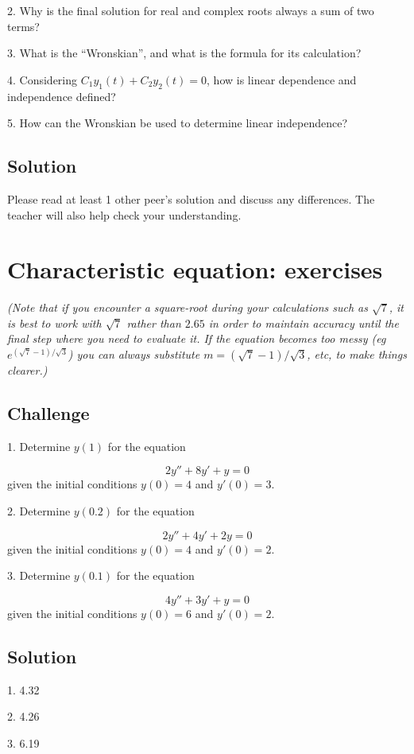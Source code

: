 2. Why is the final solution for real and complex roots always a sum of two terms?

3. What is the ``Wronskian'', and what is the formula for its calculation?

4. Considering $C_1 y_1(t) + C_2 y_2(t) = 0$, how is linear dependence and independence defined?

5. How can the Wronskian be used to determine linear independence?

\subsection*{Solution}
Please read at least 1 other peer's solution and discuss any differences. The teacher will also help check your understanding.

\timebox




\newpage
\section{Characteristic equation: exercises}

\emph{(Note that if you encounter a square-root during your calculations such as $\sqrt{7}$, it is best to work with $\sqrt{7}$ rather than $2.65$ in order to maintain accuracy until the final step where you need to evaluate it. If the equation becomes too messy (eg $e^{(\sqrt{7}-1)/\sqrt{3}}$) you can always substitute $m=(\sqrt{7}-1)/\sqrt{3}$, etc, to make things clearer.)}

\subsection*{Challenge}
1. Determine $y(1)$ for the equation

\begin{equation}
    2 y''+8y'+y=0    
\end{equation}
given the initial conditions $y(0)=4$ and $y'(0)=3$.

2. Determine $y(0.2)$ for the equation

\begin{equation}
    2y''+4y'+2y=0
\end{equation}
given the initial conditions $y(0)=4$ and $y'(0)=2$.

3. Determine $y(0.1)$ for the equation

\begin{equation}
    4y''+3y'+y=0
\end{equation}
given the initial conditions $y(0)=6$ and $y'(0)=2$.


\subsection*{Solution}
1. 4.32 %

2. 4.26 %

3. 6.19 %

\timebox





